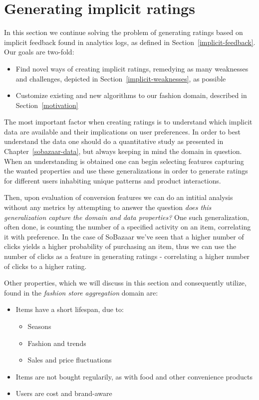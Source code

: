 \section{Generating implicit ratings}
\label{sec:implementation-implicit}

In this section we continue solving the problem of generating ratings based on
implicit feedback found in analytics logs, as defined in
Section~\ref{implicit-feedback}. Our goals are two-fold:

\begin{itemize}
  \item Find novel ways of creating implicit ratings, remedying as many
  weaknesses and challenges, depicted in Section~\ref{implicit-weaknesses}, as
  possible
  \item Customize existing and new algorithms to our fashion domain, described
  in Section~\ref{motivation}
\end{itemize}

The most important factor when creating ratings is to understand which implicit
data are available and their implications on user preferences. In order to best
understand the data one should do a quantitative study as presented in
Chapter~\ref{sobazaar-data}, but always keeping in mind the domain in question.
When an understanding is obtained one can begin selecting features capturing
the wanted properties and use these generalizations in order to generate
ratings for different users inhabiting unique patterns and product
interactions.

Then, upon evaluation of conversion features we can do an intitial analysis
without any metrics by attempting to answer the question \textit{does this
generalization capture the domain and data properties?}
One such generalization, often done, is counting the number of a specified
activity on an item, correlating it with preference. In the case of SoBazaar
we've seen that a higher number of clicks yields a higher probability of
purchasing an item, thus we can use the number of clicks as a feature in
generating ratings - correlating a higher number of clicks to a higher rating.

Other properties, which we will discuss in this section and consequently
utilize, found in the \textit{fashion store aggregation} domain are:

\begin{itemize}
  \item Items have a short lifespan, due to:
  \begin{itemize}
    \item Seasons
    \item Fashion and trends
    \item Sales and price fluctuations
  \end{itemize}
  \item Items are not bought regularily, as with food and other convenience
  products
  \item Users are cost and brand-aware
\end{itemize}

